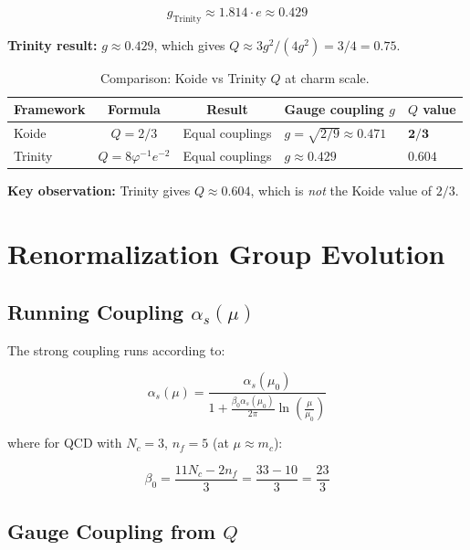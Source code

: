 \documentclass{article}
\begin{document}
\begin{equation}
  g_{\text{Trinity}} \approx 1.814 \cdot e \approx 0.429
  \label{eq:trinity-g-num}
\end{equation}

\textbf{Trinity result:} $g \approx 0.429$, which gives $Q \approx 3g^2/(4g^2) = 3/4 = 0.75$.

\begin{table}[h]
\centering
\caption{Comparison: Koide vs Trinity $Q$ at charm scale.}
\label{tab:koide-trinity}
\renewcommand{\arraystretch}{1.2}
\begin{tabular}{lcc}
\toprule
Framework & Formula & Result & Gauge coupling $g$ & $Q$ value \\
\midrule
Koide & $Q = 2/3$ & Equal couplings & $g = \sqrt{2/9} \approx 0.471$ & $\mathbf{2/3}$ \\
Trinity & $Q = 8\varphi^{-1}e^{-2}$ & Equal couplings & $g \approx 0.429$ & $\mathbf{0.604}$ \\
\bottomrule
\end{tabular}

\textbf{Key observation:} Trinity gives $Q \approx 0.604$, which is \emph{not} the Koide value of $2/3$.

\section{Renormalization Group Evolution}

\subsection{Running Coupling $\alpha_s(\mu)$}

The strong coupling runs according to:

\begin{equation}
  \alpha_s(\mu) = \frac{\alpha_s(\mu_0)}{1 + \frac{\beta_0 \alpha_s(\mu_0)}{2\pi} \ln\left(\frac{\mu}{\mu_0}\right)}
  \label{eq:rge}
\end{equation}

where for QCD with $N_c = 3$, $n_f = 5$ (at $\mu \approx m_c$):

\begin{equation}
  \beta_0 = \frac{11N_c - 2n_f}{3} = \frac{33 - 10}{3} = \frac{23}{3}
  \label{eq:beta0-qcd}
\end{equation}

\subsection{Gauge Coupling from $Q$}


\end{table}
\end{document}
